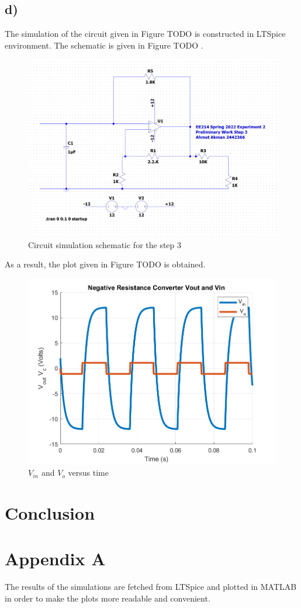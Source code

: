 \documentclass[letterpaper,12pt]{article}
\begin{document}
\subsection{d)}
The simulation of the circuit given in Figure TODO is constructed in LTSpice environment. The schematic is given in Figure TODO .
\begin{figure}[H]
    \centering
    \includegraphics[width=1\textwidth]{3Sim.png}
\caption{Circuit simulation schematic  for the step 3}
\end{figure} 
As a result, the plot given in Figure TODO is obtained.
\begin{figure}[H]
    \centering
    \includegraphics[width=1\textwidth]{3.png}
\caption{\(V_{in}\) and \(V_o\) versus time} 
\end{figure} 



\section{Conclusion}



\section*{Appendix A}
The results of the simulations are fetched from LTSpice and plotted in MATLAB in order to make the plots more readable and convenient.
\end{document}
